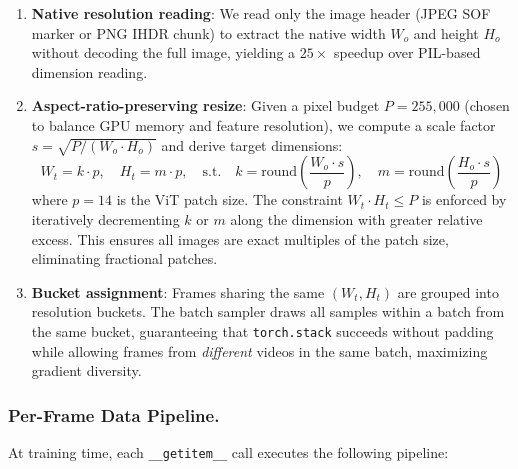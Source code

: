 \documentclass[runningheads]{llncs}
\begin{document}
\begin{enumerate}
    \item \textbf{Native resolution reading}: We read only the image header (JPEG SOF marker or PNG IHDR chunk) to extract the native width $W_o$ and height $H_o$ without decoding the full image, yielding a $25\times$ speedup over PIL-based dimension reading.
    
    \item \textbf{Aspect-ratio-preserving resize}: Given a pixel budget $P = 255{,}000$ (chosen to balance GPU memory and feature resolution), we compute a scale factor $s = \sqrt{P / (W_o \cdot H_o)}$ and derive target dimensions:
    \begin{equation}
        W_t = k \cdot p, \quad H_t = m \cdot p, \quad \text{s.t.} \quad k = \text{round}\!\left(\frac{W_o \cdot s}{p}\right), \quad m = \text{round}\!\left(\frac{H_o \cdot s}{p}\right)
    \end{equation}
    where $p = 14$ is the ViT patch size. The constraint $W_t \cdot H_t \leq P$ is enforced by iteratively decrementing $k$ or $m$ along the dimension with greater relative excess. This ensures all images are exact multiples of the patch size, eliminating fractional patches.
    
    \item \textbf{Bucket assignment}: Frames sharing the same $(W_t, H_t)$ are grouped into resolution buckets. The batch sampler draws all samples within a batch from the same bucket, guaranteeing that \texttt{torch.stack} succeeds without padding while allowing frames from \emph{different} videos in the same batch, maximizing gradient diversity.
\end{enumerate}

\subsubsection{Per-Frame Data Pipeline.}
At training time, each \texttt{\_\_getitem\_\_} call executes the following pipeline:
\end{document}
